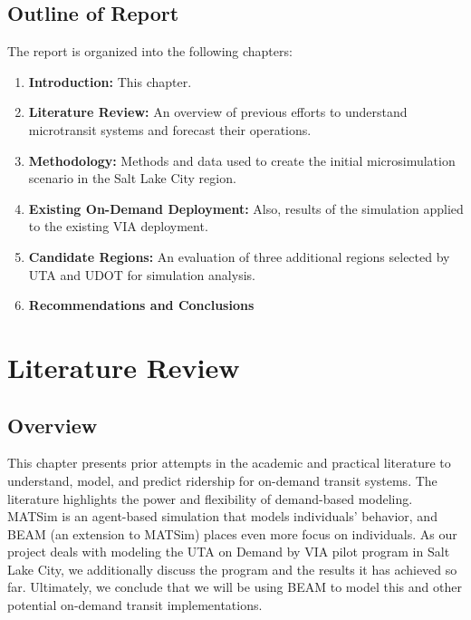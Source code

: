 \documentclass[
]{article}
\providecommand{\tightlist}{%
  \setlength{\itemsep}{0pt}\setlength{\parskip}{0pt}}
\begin{document}
\hypertarget{outline-of-report}{%
\subsection{Outline of Report}\label{outline-of-report}}

The report is organized into the following chapters:

\begin{enumerate}
\def\labelenumi{\arabic{enumi}.}
\tightlist
\item
  \textbf{Introduction:} This chapter.
\item
  \textbf{Literature Review:} An overview of previous efforts to understand microtransit systems and forecast their operations.
\item
  \textbf{Methodology:} Methods and data used to create the initial microsimulation scenario in the Salt Lake City region.
\item
  \textbf{Existing On-Demand Deployment:} Also, results of the simulation applied to the existing VIA deployment.
\item
  \textbf{Candidate Regions:} An evaluation of three additional regions selected by UTA and UDOT for simulation analysis.
\item
  \textbf{Recommendations and Conclusions}
\end{enumerate}

\hypertarget{literature-review}{%
\section{Literature Review}\label{literature-review}}

\hypertarget{overview}{%
\subsection{Overview}\label{overview}}

This chapter presents prior attempts in the academic and practical literature to understand, model, and predict ridership for on-demand transit systems. The literature highlights the power and flexibility of demand-based modeling. MATSim is an agent-based simulation that models individuals' behavior, and BEAM (an extension to MATSim) places even more focus on individuals. As our project deals with modeling the UTA on Demand by VIA pilot program in Salt Lake City, we additionally discuss the program and the results it has achieved so far. Ultimately, we conclude that we will be using BEAM to model this and other potential on-demand transit implementations.
\end{document}

